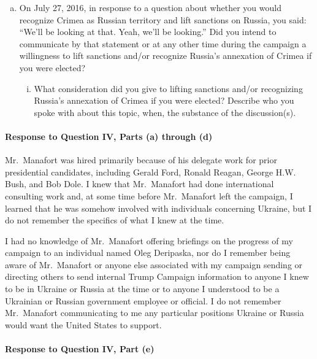 \begin{enumerate}[a.]
\item On July 27, 2016, in response to a question about whether you would recognize Crimea as Russian territory and lift sanctions on Russia, you said: “We'll be looking at that. Yeah, we'll be looking.”
Did you intend to communicate by that statement or at any other time during the campaign a willingness to lift sanctions and/or recognize Russia’s annexation of Crimea if you were elected?

\begin{enumerate}[i.]

\item What consideration did you give to lifting sanctions and/or recognizing Russia’s annexation of Crimea if you were elected?
Describe who you spoke with about this topic, when, the substance of the discussion(s).

\end{enumerate}

\end{enumerate}

\paragraph*{Response to Question IV, Parts (a) through (d)}

Mr.~Manafort was hired primarily because of his delegate work for prior presidential candidates, including Gerald Ford, Ronald Reagan, George H.W. Bush, and Bob Dole.
I knew that Mr.~Manafort had done international consulting work and, at some time before Mr.~Manafort left the campaign, I learned that he was somehow involved with individuals concerning Ukraine, but I do not remember the specifics of what I knew at the time.

I had no knowledge of Mr.~Manafort offering briefings on the progress of my campaign to an individual named Oleg Deripaska, nor do I remember being aware of Mr.~Manafort or anyone else associated with my campaign sending or directing others to send internal Trump Campaign information to anyone I knew to be in Ukraine or Russia at the time or to anyone I understood to be a Ukrainian or Russian government employee or official.
I do not remember Mr.~Manafort communicating to me any particular positions Ukraine or Russia would want the United States to support.

\paragraph*{Response to Question IV, Part (e)}

